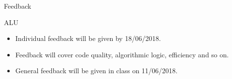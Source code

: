 \documentclass[pdf]{beamer}
\begin{document}
\begin{frame}{Feedback}
    \begin{block}{ALU}
        \begin{itemize}
            \item Individual feedback will be given by 18/06/2018.
            \item Feedback will cover code quality, algorithmic logic, efficiency and so on.
            \item General feedback will be given in class on 11/06/2018.
        \end{itemize}
    \end{block}
\end{frame}
\end{document}
